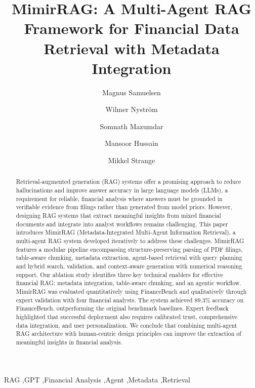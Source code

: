 \documentclass[final,5p,times,twopage,twocolumn,a4paper]{elsarticle}
\begin{document}
\begin{frontmatter}
\title{MimirRAG: A Multi-Agent RAG Framework for Financial Data Retrieval with Metadata Integration}

\author[label1]{Magnus Samuelsen}

\author[label1]{Wilmer Nyström}

\author[label1]{Somnath Mazumdar}

\author[label2]{Mansoor Hussain}

\author[label2]{Mikkel Strange}



\begin{abstract}
Retrieval-augmented generation (RAG) systems offer a promising approach to reduce hallucinations and improve answer accuracy in large language models (LLMs), a requirement for reliable, financial analysis where answers must be grounded in verifiable evidence from filings rather than generated from model priors. However, designing RAG systems that extract meaningful insights from mixed financial documents and integrate into analyst workflows remains challenging. This paper introduces MimirRAG (Metadata-Integrated Multi-Agent Information Retrieval), a multi-agent RAG system developed iteratively to address these challenges. MimirRAG features a modular pipeline encompassing structure-preserving parsing of PDF filings, table-aware chunking, metadata extraction, agent-based retrieval with query planning and hybrid search, validation, and context-aware generation with numerical reasoning support. Our ablation study identifies three key technical enablers for effective financial RAG: metadata integration, table-aware chunking, and an agentic workflow. MimirRAG was evaluated quantitatively using FinanceBench and qualitatively through expert validation with four financial analysts. The system achieved 89.3\% accuracy on FinanceBench, outperforming the original benchmark baselines. Expert feedback highlighted that successful deployment also requires calibrated trust, comprehensive data integration, and user personalization. We conclude that combining multi-agent RAG architecture with human-centric design principles can improve the extraction of meaningful insights in financial analysis.
\end{abstract}

\begin{keyword}
RAG \sep  GPT \sep  Financial Analysis \sep  Agent \sep  Metadata \sep  Retrieval
\end{keyword}

\end{frontmatter}
\end{document}

